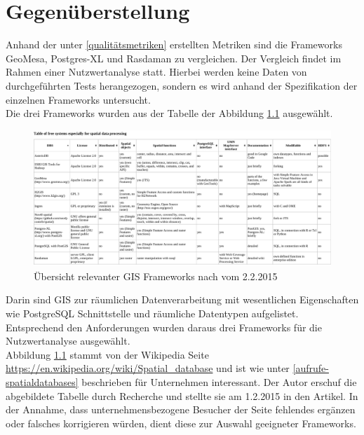 \chapter{Gegenüberstellung}

Anhand der unter \ref{qualitätsmetriken} erstellten Metriken sind die Frameworks GeoMesa, Postgres-XL und Rasdaman zu vergleichen.
Der Vergleich findet im Rahmen einer Nutzwertanalyse statt.
Hierbei werden keine Daten von durchgeführten Tests herangezogen, sondern es wird anhand der Spezifikation der einzelnen Frameworks untersucht.\\
%
Die drei Frameworks wurden aus der Tabelle der Abbildung \ref{fig:spatialdatabases} ausgewählt.
\begin{figure}
\centering
\includegraphics[width=\textwidth]{Abbildungen/table_spatialdatabases_13_2_15.pdf}
\caption[Übersicht relevanter GIS Frameworks]{Übersicht relevanter GIS Frameworks nach \cite{website:wiki-spatialdatabase} vom 2.2.2015}
\label{fig:spatialdatabases}
\end{figure}
Darin sind GIS zur räumlichen Datenverarbeitung mit wesentlichen Eigenschaften wie PostgreSQL Schnittstelle und räumliche Datentypen aufgelistet.
Entsprechend den Anforderungen wurden daraus drei Frameworks für die Nutzwertanalyse ausgewählt.\\
Abbildung \ref{fig:spatialdatabases} stammt von der Wikipedia Seite \url{https://en.wikipedia.org/wiki/Spatial_database} und ist wie unter \ref{aufrufe-spatialdatabases} beschrieben für Unternehmen interessant.
Der Autor erschuf die abgebildete Tabelle durch Recherche und stellte sie am 1.2.2015 in den Artikel.
In der Annahme, dass unternehmensbezogene Besucher der Seite fehlendes ergänzen oder falsches korrigieren würden, dient diese zur Auswahl geeigneter Frameworks.


